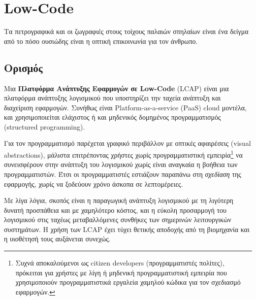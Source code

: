 \chapter{Low-Code}
    Τα πετρογραφικά και οι ζωγραφιές στους τοίχους παλαιών σπηλαίων είναι ένα δείγμα από το πόσο ουσιώδης είναι η οπτική επικοινωνία για τον άνθρωπο. \cite{CASEKuhn}


    \section{Ορισμός}
        Μια \textbf{Πλατφόρμα Ανάπτυξης Εφαρμογών σε Low-Code} (LCAP) είναι μια πλατφόρμα ανάπτυξης λογισμικού που υποστηρίζει την ταχεία ανάπτυξη και διαχείριση εφαρμογών. Συνήθως είναι Platform-as-a-service (PaaS) cloud μοντέλα, και χρησιμοποιείται ελάχιστος ή και μηδενικός δομημένος προγραμματισμός (structured \linebreak programming).

        Για τον προγραμματισμό παρέχεται γραφικό περιβάλλον με οπτικές αφαιρέσεις (visual abstractions), μάλιστα επιτρέποντας χρήστες χωρίς προγραμματιστική εμπειρία\footnote{Συχνά αποκαλούμενοι ως citizen developers (προγραμματιστές πολίτες), πρόκειται για χρήστες με λίγη ή μηδενική προγραμματιστική εμπειρία που χρησιμοποιούν προγραμματιστικά εργαλεία χαμηλού κώδικα για τον σχεδιασμό εφαρμογών.} να συνεισφέρουν στην ανάπτυξη του λογισμικού χωρίς είναι αναγκαία η βοήθεια των προγραμματιστών. Έτσι οι προγραμματιστές εστιάζουν παραπάνω στη \textit{σχεδίαση} της εφαρμογής, χωρίς να ξοδεύουν χρόνο άσκοπα σε λεπτομέρειες.

        Με λίγα λόγια, σκοπός είναι η παραγωγική ανάπτυξη λογισμικού με τη λιγότερη δυνατή προσπάθεια και με χαμηλότερο κόστος, και η εύκολη προσαρμογή του λογισμικού στις ταχέως μεταβαλλόμενες συνθήκες των σημερινών λειτουργικών συστημάτων. Η χρήση των LCAP έχει τύχει θετικής αποδοχής από τη βιομηχανία και η υιοθέτησή τους αυξάνεται συνεχώς. \cite{Bock2021,Bucaioni2022,Sahay2020}

